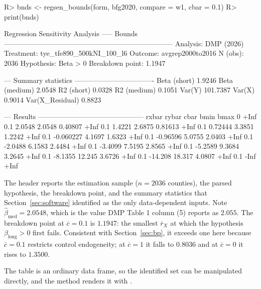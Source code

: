 \documentclass[article]{jss}\usepackage[]{graphicx}\usepackage[]{xcolor}
\newcommand{\blong}{\beta_{\mathrm{long}}}
\newcommand{\bmed}{\beta_{\mathrm{med}}}
\newcommand{\rxbar}{\ensuremath{\overline{r}_X}}
\newcommand{\cbar}{\ensuremath{\overline{c}}}
\begin{document}
\begin{Schunk}
\begin{Sinput}
R> bnds <- regsen_bounds(form, bfg2020, compare = w1, cbar = 0.1)
R> print(bnds)
\end{Sinput}
\begin{Soutput}

Regression Sensitivity Analysis ----- Bounds
------------------------------------------------------------------------
Analysis:          DMP (2026)
Treatment:         tye_tfe890_500kNI_100_l6
Outcome:           avgrep2000to2016
N (obs):           2036
Hypothesis:        Beta > 0
Breakdown point:   1.1947

--- Summary statistics ----------------------------------
  Beta (short)                  1.9246
  Beta (medium)                 2.0548
  R2 (short)                    0.0328
  R2 (medium)                   0.1051
  Var(Y)                      101.7387
  Var(X)                        0.9014
  Var(X_Residual)               0.8823

--- Results ---------------------------------------------
   rxbar rybar   cbar      bmin   bmax
       0  +Inf    0.1    2.0548 2.0548
 0.40807  +Inf    0.1    1.4221 2.6875
 0.81613  +Inf    0.1   0.72444 3.3851
  1.2242  +Inf    0.1 -0.060227 4.1697
  1.6323  +Inf    0.1  -0.96596 5.0755
  2.0403  +Inf    0.1   -2.0488 6.1583
  2.4484  +Inf    0.1   -3.4099 7.5195
  2.8565  +Inf    0.1   -5.2589 9.3684
  3.2645  +Inf    0.1   -8.1355 12.245
  3.6726  +Inf    0.1   -14.208 18.317
  4.0807  +Inf    0.1      -Inf   +Inf
\end{Soutput}
\end{Schunk}



The header reports the estimation sample ($n = 2036$ counties),
the parsed hypothesis, the breakdown point, and the summary statistics that
Section~\ref{sec:software} identified as the only data-dependent inputs.
Note $\hat\bmed = 2.0548$, which is the value
DMP Table 1 column (5) reports as $2.055$. The breakdown point at
$\cbar = 0.1$ is $1.1947$: the smallest $\rxbar$ at which
the hypothesis $\blong > 0$ first fails. Consistent with
Section~\ref{sec:bp}, it exceeds one here because $\cbar = 0.1$ restricts
control endogeneity; at $\cbar = 1$ it falls to
$0.8036$ and at $\cbar = 0$ it rises to
$1.3500$.

The  table is an ordinary data frame, so the identified set
can be manipulated directly, and the  method renders it with
.
\end{document}
